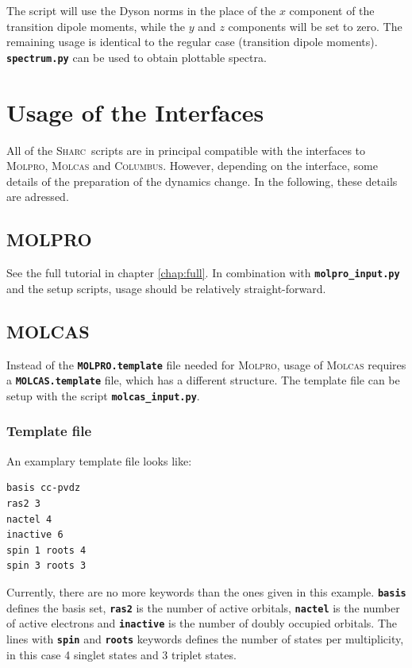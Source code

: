 \documentclass[a4paper,11pt,DIV=15,openany]{scrbook}
\newcommand{\sharc}{\textsc{Sharc}}
\newcommand{\ttt}[1]{\textbf{\texttt{#1}}}
\begin{document}
\normalsize
The script will use the Dyson norms in the place of the $x$ component of the transition dipole moments, while the $y$ and $z$ components will be set to zero. The remaining usage is identical to the regular case (transition dipole moments). \ttt{spectrum.py} can be used to obtain plottable spectra.

\chapter{Usage of the Interfaces}

All of the \sharc\ scripts are in principal compatible with the interfaces to \textsc{Molpro}, \textsc{Molcas} and \textsc{Columbus}. However, depending on the interface, some details of the preparation of the dynamics change. In the following, these details are adressed.

\section{MOLPRO}

See the full tutorial in chapter \ref{chap:full}. In combination with \ttt{molpro\_input.py} and the setup scripts, usage should be relatively straight-forward.

\section{MOLCAS}

Instead of the \ttt{MOLPRO.template} file needed for \textsc{Molpro}, usage of \textsc{Molcas} requires a \ttt{MOLCAS.template} file, which has a different structure. The template file can be setup with the script \ttt{molcas\_input.py}.

\subsection{Template file}

An examplary template file looks like:
\begin{oframed}
\footnotesize\begin{Verbatim}[commandchars=\\\{\}]
basis cc-pvdz
ras2 3
nactel 4
inactive 6
spin 1 roots 4
spin 3 roots 3
\end{Verbatim}
\end{oframed}

Currently, there are no more keywords than the ones given in this example. \ttt{basis} defines the basis set, \ttt{ras2} is the number of active orbitals, \ttt{nactel} is the number of active electrons and \ttt{inactive} is the number of doubly occupied orbitals. 
The lines with \ttt{spin} and \ttt{roots} keywords defines the number of states per multiplicity, in this case 4 singlet states and 3 triplet states.
\end{document}
